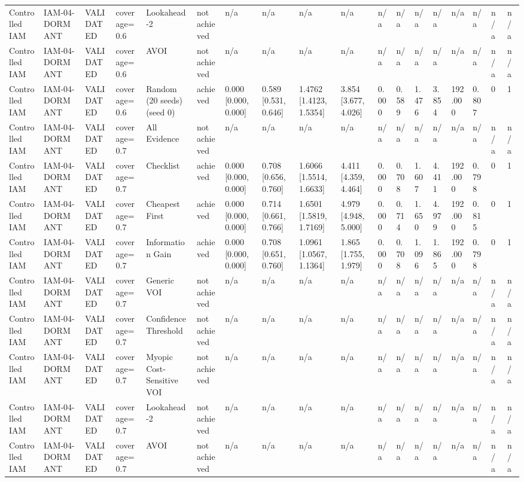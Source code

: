 \begin{table}[!ht]
{\begin{tabular}{llllllllllllllllll}
Controlled IAM & IAM-04-DORMANT & VALIDATED & coverage=0.6 & Lookahead-2 & not achieved & n/a & n/a & n/a & n/a & n/a & n/a & n/a & n/a & n/a & n/a & n/a & n/a \\
Controlled IAM & IAM-04-DORMANT & VALIDATED & coverage=0.6 & AVOI & not achieved & n/a & n/a & n/a & n/a & n/a & n/a & n/a & n/a & n/a & n/a & n/a & n/a \\
Controlled IAM & IAM-04-DORMANT & VALIDATED & coverage=0.6 & Random (20 seeds) (seed 0) & achieved & 0.000 [0.000, 0.000] & 0.589 [0.531, 0.646] & 1.4762 [1.4123, 1.5354] & 3.854 [3.677, 4.026] & 0.000 & 0.589 & 1.476 & 3.854 & 192.000 & 0.807 & 0 & 1 \\
Controlled IAM & IAM-04-DORMANT & VALIDATED & coverage=0.7 & All Evidence & not achieved & n/a & n/a & n/a & n/a & n/a & n/a & n/a & n/a & n/a & n/a & n/a & n/a \\
Controlled IAM & IAM-04-DORMANT & VALIDATED & coverage=0.7 & Checklist & achieved & 0.000 [0.000, 0.000] & 0.708 [0.656, 0.760] & 1.6066 [1.5514, 1.6633] & 4.411 [4.359, 4.464] & 0.000 & 0.708 & 1.607 & 4.411 & 192.000 & 0.798 & 0 & 1 \\
Controlled IAM & IAM-04-DORMANT & VALIDATED & coverage=0.7 & Cheapest First & achieved & 0.000 [0.000, 0.000] & 0.714 [0.661, 0.766] & 1.6501 [1.5819, 1.7169] & 4.979 [4.948, 5.000] & 0.000 & 0.714 & 1.650 & 4.979 & 192.000 & 0.815 & 0 & 1 \\
Controlled IAM & IAM-04-DORMANT & VALIDATED & coverage=0.7 & Information Gain & achieved & 0.000 [0.000, 0.000] & 0.708 [0.651, 0.760] & 1.0961 [1.0567, 1.1364] & 1.865 [1.755, 1.979] & 0.000 & 0.708 & 1.096 & 1.865 & 192.000 & 0.798 & 0 & 1 \\
Controlled IAM & IAM-04-DORMANT & VALIDATED & coverage=0.7 & Generic VOI & not achieved & n/a & n/a & n/a & n/a & n/a & n/a & n/a & n/a & n/a & n/a & n/a & n/a \\
Controlled IAM & IAM-04-DORMANT & VALIDATED & coverage=0.7 & Confidence Threshold & not achieved & n/a & n/a & n/a & n/a & n/a & n/a & n/a & n/a & n/a & n/a & n/a & n/a \\
Controlled IAM & IAM-04-DORMANT & VALIDATED & coverage=0.7 & Myopic Cost-Sensitive VOI & not achieved & n/a & n/a & n/a & n/a & n/a & n/a & n/a & n/a & n/a & n/a & n/a & n/a \\
Controlled IAM & IAM-04-DORMANT & VALIDATED & coverage=0.7 & Lookahead-2 & not achieved & n/a & n/a & n/a & n/a & n/a & n/a & n/a & n/a & n/a & n/a & n/a & n/a \\
Controlled IAM & IAM-04-DORMANT & VALIDATED & coverage=0.7 & AVOI & not achieved & n/a & n/a & n/a & n/a & n/a & n/a & n/a & n/a & n/a & n/a & n/a & n/a \\

\end{tabular}}
\end{table}
